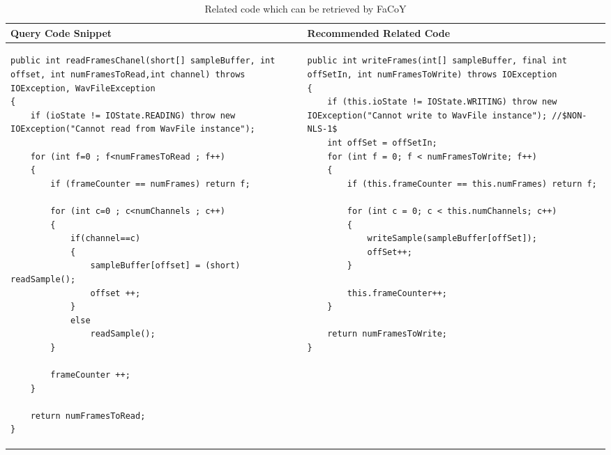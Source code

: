 \lstset{
	frame=none,
	aboveskip=0pt,
	belowskip=0pt,
	basicstyle=\tiny\ttfamily,
}
\begin{table*}\scriptsize
	\caption{Related code which can be retrieved by FaCoY}
	\label{tab:facoy-example}
	
	\setlength{\tabcolsep}{0.01\textwidth}
	\begin{tabular}{@{}p{}p{}@{}}
		\toprule
		Query Code Snippet & Recommended Related Code \\
		\midrule


\begin{lstlisting}
public int readFramesChanel(short[] sampleBuffer, int offset, int numFramesToRead,int channel) throws IOException, WavFileException
{
	if (ioState != IOState.READING) throw new IOException("Cannot read from WavFile instance");

	for (int f=0 ; f<numFramesToRead ; f++)
	{
		if (frameCounter == numFrames) return f;

		for (int c=0 ; c<numChannels ; c++)
		{
			if(channel==c)
			{
				sampleBuffer[offset] = (short) readSample();
				offset ++;
			}
			else
				readSample();
		}

		frameCounter ++;
	}

	return numFramesToRead;
}
\end{lstlisting}
		
		&
\begin{lstlisting}
public int writeFrames(int[] sampleBuffer, final int offSetIn, int numFramesToWrite) throws IOException
{
	if (this.ioState != IOState.WRITING) throw new IOException("Cannot write to WavFile instance"); //$NON-NLS-1$
	int offSet = offSetIn;
	for (int f = 0; f < numFramesToWrite; f++)
	{
		if (this.frameCounter == this.numFrames) return f;

		for (int c = 0; c < this.numChannels; c++)
		{
			writeSample(sampleBuffer[offSet]);
			offSet++;
		}

		this.frameCounter++;
	}

	return numFramesToWrite;
}
		
\end{lstlisting}
\\

\bottomrule
	\end{tabular}
\end{table*}
		

